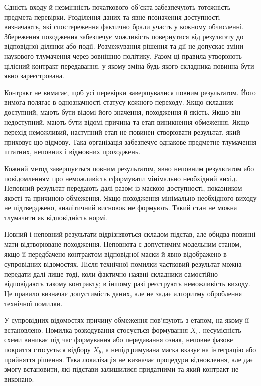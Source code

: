 Єдність входу й незмінність початкового об’єкта забезпечують тотожність предмета перевірки. Розділення даних та явне позначення доступності визначають, які спостереження фактично брали участь у кожному обчисленні. Збереження походження забезпечує можливість повернутися від результату до відповідної ділянки або події. Розмежування рішення та дії не допускає зміни наукового тлумачення через зовнішню політику. Разом ці правила утворюють цілісний контракт передавання, у якому зміна будь-якого складника повинна бути явно зареєстрована.

Контракт не вимагає, щоб усі перевірки завершувалися повним результатом. Його вимога полягає в однозначності статусу кожного переходу. Якщо складник доступний, мають бути відомі його значення, походження й якість. Якщо він недоступний, мають бути відомі причина та етап виникнення обмеження. Якщо перехід неможливий, наступний етап не повинен створювати результат, який приховує цю відмову. Така організація забезпечує однакове предметне тлумачення штатних, неповних і відмовних проходжень.

Кожний метод завершується повним результатом, явно неповним результатом або повідомленням про неможливість сформувати мінімально необхідний вихід. Неповний результат передають далі разом із маскою доступності, показником якості та причиною обмеження. Якщо походження мінімально необхідного виходу не підтверджено, аналітичний висновок не формують. Такий стан не можна тлумачити як відповідність нормі.

Повний і неповний результати відрізняються складом підстав, але обидва повинні мати відтворюване походження. Неповнота є допустимим модельним станом, якщо її передбачено контрактом відповідної маски й явно відображено в супровідних відомостях. Після технічної помилки частковий результат можна передати далі лише тоді, коли фактично наявні складники самостійно відповідають такому контракту; в іншому разі реєструють неможливість виходу. Це правило визначає допустимість даних, але не задає алгоритму оброблення технічної помилки.

У супровідних відомостях причину обмеження пов’язують з етапом, на якому її встановлено. Помилка розкодування стосується формування $X_v$, несумісність схеми виникає під час формування або передавання ознак, неповне фазове покриття стосується відбору $X_b$, а непідтримувана маска вказує на інтеграцію або прийняття рішення. Така локалізація не визначає процедури відновлення, але дає змогу встановити, які підстави залишилися придатними та який контракт не виконано.

